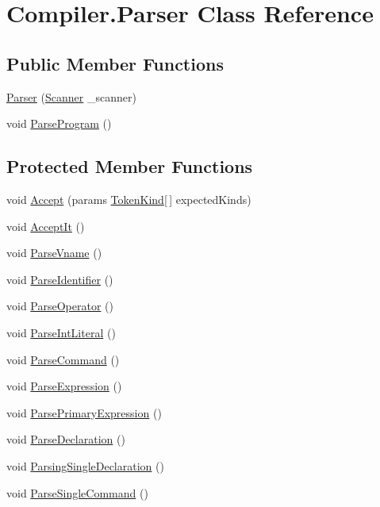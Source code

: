 \hypertarget{class_compiler_1_1_parser}{}\section{Compiler.\+Parser Class Reference}
\label{class_compiler_1_1_parser}
\subsection*{Public Member Functions}
\begin{DoxyCompactItemize}
\item 
\mbox{\hyperlink{class_compiler_1_1_parser_a450e11452db3f91ff866fc1e36ebc79d}{Parser}} (\mbox{\hyperlink{class_compiler_1_1_scanner}{Scanner}} \+\_\+scanner)
\item 
void \mbox{\hyperlink{class_compiler_1_1_parser_a426c99f29306aea343a0c0a7f8f3fbff}{Parse\+Program}} ()
\end{DoxyCompactItemize}
\subsection*{Protected Member Functions}
\begin{DoxyCompactItemize}
\item 
void \mbox{\hyperlink{class_compiler_1_1_parser_a092fb9fb971023a089eb7505d2223610}{Accept}} (params \mbox{\hyperlink{namespace_compiler_a57929962f25004759596fc3f13cf563c}{Token\+Kind}}\mbox{[}$\,$\mbox{]} expected\+Kinds)
\item 
void \mbox{\hyperlink{class_compiler_1_1_parser_ae19e507e1e2460cbad35b03d24402b4f}{Accept\+It}} ()
\item 
void \mbox{\hyperlink{class_compiler_1_1_parser_a868e2e8aca5f72d2e7d2d91f21719b5e}{Parse\+Vname}} ()
\item 
void \mbox{\hyperlink{class_compiler_1_1_parser_af099ac84308e83bf30b3dfd6dc51bd32}{Parse\+Identifier}} ()
\item 
void \mbox{\hyperlink{class_compiler_1_1_parser_ae03983db321bc672df2b8400f03eb67e}{Parse\+Operator}} ()
\item 
void \mbox{\hyperlink{class_compiler_1_1_parser_a052fa556c8a6b8a8d677a1faaa3342db}{Parse\+Int\+Literal}} ()
\item 
void \mbox{\hyperlink{class_compiler_1_1_parser_a7ab30d3d783ccf064784df2df654ea76}{Parse\+Command}} ()
\item 
void \mbox{\hyperlink{class_compiler_1_1_parser_a8c6c2073d17ac572fb9117892cbf5aa1}{Parse\+Expression}} ()
\item 
void \mbox{\hyperlink{class_compiler_1_1_parser_a9ce17cf1f3fa7062daf05481f3230330}{Parse\+Primary\+Expression}} ()
\item 
void \mbox{\hyperlink{class_compiler_1_1_parser_ab9718b82a785e63b848e51c39bbe8ee7}{Parse\+Declaration}} ()
\item 
void \mbox{\hyperlink{class_compiler_1_1_parser_ad0b467a2202c311d465a11165f602216}{Parsing\+Single\+Declaration}} ()
\item 
void \mbox{\hyperlink{class_compiler_1_1_parser_af315f582be84f8e1b37add91efa3afc0}{Parse\+Single\+Command}} ()
\end{DoxyCompactItemize}


